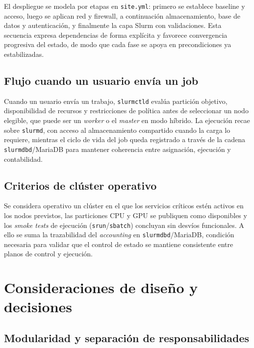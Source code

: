 El despliegue se modela por etapas en \texttt{site.yml}: primero se establece baseline y acceso, luego se aplican red y firewall, a continuación almacenamiento, base de datos y autenticación, y finalmente la capa Slurm con validaciones. Esta secuencia expresa dependencias de forma explícita y favorece convergencia progresiva del estado, de modo que cada fase se apoya en precondiciones ya estabilizadas.

\subsection{Flujo cuando un usuario envía un job}
\label{subsec:arq_flujo_job}

Cuando un usuario envía un trabajo, \texttt{slurmctld} evalúa partición objetivo, disponibilidad de recursos y restricciones de política antes de seleccionar un nodo elegible, que puede ser un \textit{worker} o el \textit{master} en modo híbrido. La ejecución recae sobre \texttt{slurmd}, con acceso al almacenamiento compartido cuando la carga lo requiere, mientras el ciclo de vida del job queda registrado a través de la cadena \texttt{slurmdbd}/MariaDB para mantener coherencia entre asignación, ejecución y contabilidad.

\subsection{Criterios de clúster operativo}
\label{subsec:arq_operativo}

Se considera operativo un clúster en el que los servicios críticos estén activos en los nodos previstos, las particiones CPU y GPU se publiquen como disponibles y los \textit{smoke tests} de ejecución (\texttt{srun}/\texttt{sbatch}) concluyan sin desvíos funcionales. A ello se suma la trazabilidad del \textit{accounting} en \texttt{slurmdbd}/MariaDB, condición necesaria para validar que el control de estado se mantiene consistente entre planos de control y ejecución.

\section{Consideraciones de diseño y decisiones}
\label{sec:arq_consideraciones}

\subsection{Modularidad y separación de responsabilidades}
\label{subsec:arq_modularidad}

